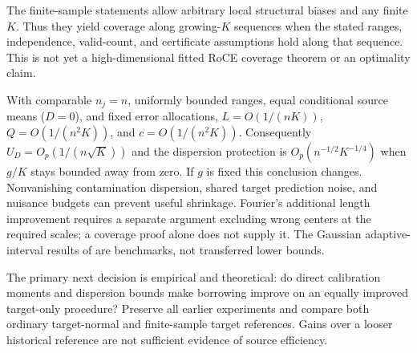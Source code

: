 The finite-sample statements allow arbitrary local structural biases and
any finite $K$. Thus they yield coverage along growing-$K$ sequences when
the stated ranges, independence, valid-count, and certificate assumptions
hold along that sequence. This is not yet a high-dimensional fitted RoCE
coverage theorem or an optimality claim.

With comparable $n_j=n$, uniformly bounded ranges, equal conditional source means ($D=0$), and
fixed error allocations, $L=O(1/(nK))$, $Q=O(1/(n^2K))$, and
$c=O(1/(n^2K))$. Consequently $U_D=O_p(1/(n\sqrt K))$ and the dispersion
protection is $O_p(n^{-1/2}K^{-1/4})$ when $g/K$ stays bounded away from zero.
If $g$ is fixed this conclusion changes. Nonvanishing contamination dispersion,
shared target prediction noise, and nuisance budgets can prevent useful
shrinkage. Fourier's additional length improvement requires a separate
argument excluding wrong centers at the required scales; a coverage proof
alone does not supply it. The Gaussian adaptive-interval results of
\citet{wang2026} are benchmarks, not transferred lower bounds.

The primary next decision is empirical and theoretical: do direct calibration
moments and dispersion bounds make borrowing improve on an equally improved
target-only procedure? Preserve all earlier experiments and compare both
ordinary target-normal and finite-sample target references. Gains over a
looser historical reference are not sufficient evidence of source efficiency.
